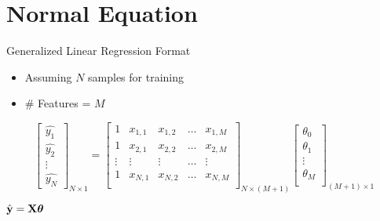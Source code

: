\documentclass{beamer}
\begin{document}
\section{Normal Equation}
\begin{frame}{Generalized Linear Regression Format}
\begin{itemize}[<+->]
	\item Assuming $N$ samples for training
	\item \# Features = $M$
\end{itemize}


   \pause \[\begin{bmatrix}
        \hat{y_{1}}\\
        \hat{y_{2}} \\
        \vdots \\
        \hat{y_{N}}
    \end{bmatrix}_{N \times 1}
    =     \begin{bmatrix}
        1 & x_{1,1} & x_{1,2} & \dots & x_{1,M}\\
        1 & x_{2,1} & x_{2,2} & \dots & x_{2,M}\\
        \vdots & \vdots & \vdots & \dots & \vdots\\
        1 & x_{N,1} & x_{N,2} & \dots & x_{N,M}\\
    \end{bmatrix}_{N \times (M+1)}
    \begin{bmatrix}
        \theta_{0}\\
        \theta_{1}\\
        \vdots \\
        \theta_{M}\\
    \end{bmatrix}_{(M+1)\times 1}
   \]
   
   
  \pause  \begin{tcolorbox}
   \begin{center}
       
   

   $ \hat{\mathbf{y}} = \mathbf{X}\boldsymbol{\theta}$
   \end{center}
   \end{tcolorbox}

   
\end{frame}
\end{document}
